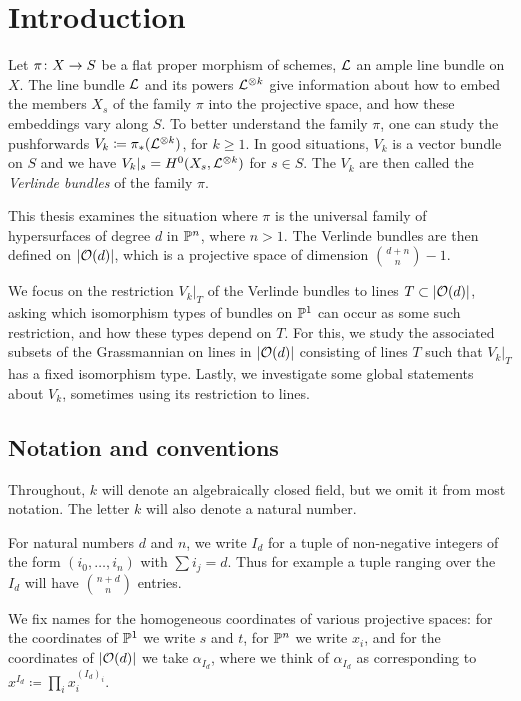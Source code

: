 \section{Introduction}

Let $\pi\colon X\to S$ be a flat proper morphism of schemes, $\mathcal{L}$ an ample line bundle on $X$. The line bundle $\mathcal{L}$ and its powers $\mathcal{L}^{\otimes k}$ give information about how to embed the members $X_s$ of the family $\pi$ into the projective space, and how these embeddings vary along $S$. To better understand the family $\pi$, one can study the pushforwards
$V_k\coloneqq \pi_*(\mathcal{L}^{\otimes k})$, for $k\geq 1$. In good situations, $V_k$ is a vector bundle on $S$ and we have $V_k|_s = H^0(X_s, \mathcal{L}^{\otimes k})$ for $s\in S$. The $V_k$ are then called the \emph{Verlinde bundles} of the family $\pi$.

This thesis examines the situation where $\pi$ is the universal family of hypersurfaces of degree $d$ in $\mathbb{P}^n$, where $n>1$. The Verlinde bundles are then defined on $\lvert\mathcal{O}(d)\rvert$, which is a projective space of dimension $\binom{d+n}{n} - 1$.

We focus on the restriction $V_k|_T$ of the Verlinde bundles to lines $T\subset \lvert\mathcal{O}(d)\rvert$, asking which isomorphism types of bundles on $\mathbb{P}^1$ can occur as some such restriction, and how these types depend on $T$. For this, we study the associated subsets of the Grassmannian on lines in $\lvert\mathcal{O}(d)\rvert$ consisting of lines $T$ such that $V_k|_T$ has a fixed isomorphism type. Lastly, we investigate some global statements about $V_k$, sometimes using its restriction to lines.

\subsection{Notation and conventions}
Throughout, $k$ will denote an algebraically closed field, but we omit it from most notation. The letter $k$ will also denote a natural number.

For natural numbers $d$ and $n$, we write $I_d$ for a tuple of non-negative integers of the form $(i_0,\dotsc,i_n)$ with
$\sum i_j = d$. Thus for example a tuple ranging over the $I_d$ will have $\binom{n+d}{n}$ entries.

We fix names for the homogeneous coordinates of various projective spaces: for the coordinates of $\mathbb{P}^1$ we write $s$ and $t$, for $\mathbb{P}^n$ we write $x_i$, and for the coordinates of $\lvert\mathcal{O}(d)\rvert$ we take $\alpha_{I_d}$, where we think of $\alpha_{I_d}$ as corresponding to $x^{I_d}\coloneqq \prod_{i} x_i^{(I_d)_i}$.

